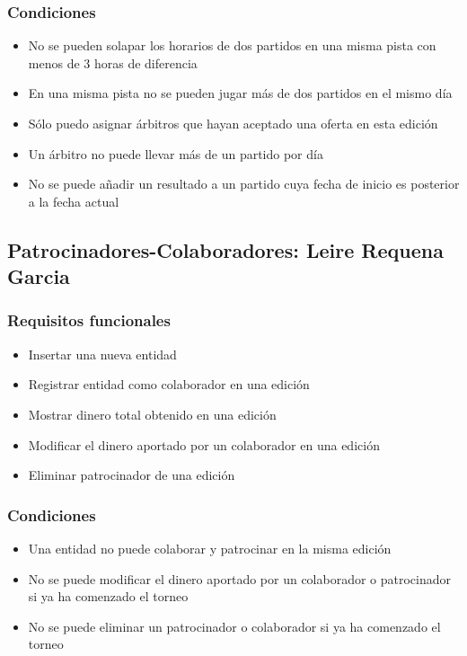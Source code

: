 \subsubsection{Condiciones}
\begin{itemize}
	\item No se pueden solapar los horarios de dos partidos en una misma pista con menos de 3 horas de diferencia
	\item En una misma pista no se pueden jugar más de dos partidos en el mismo día
	\item Sólo puedo asignar árbitros que hayan aceptado una oferta en esta edición
	\item Un árbitro no puede llevar más de un partido por día
	\item No se puede añadir un resultado a un partido cuya fecha de inicio es posterior a la fecha actual
\end{itemize}

\subsection{Patrocinadores-Colaboradores: Leire Requena Garcia}
\subsubsection{Requisitos funcionales}
\begin{itemize}
	\item Insertar una nueva entidad
	\item Registrar entidad como colaborador en una edición
	\item Mostrar dinero total obtenido en una edición
	\item Modificar el dinero aportado por un colaborador en una edición
	\item Eliminar patrocinador de una edición
\end{itemize}

\subsubsection{Condiciones}
\begin{itemize}
	\item Una entidad no puede colaborar y patrocinar en la misma edición
	\item No se puede modificar el dinero aportado por un colaborador o patrocinador si ya ha comenzado el torneo
	\item No se puede eliminar un patrocinador o colaborador si ya ha comenzado el torneo
\end{itemize}

